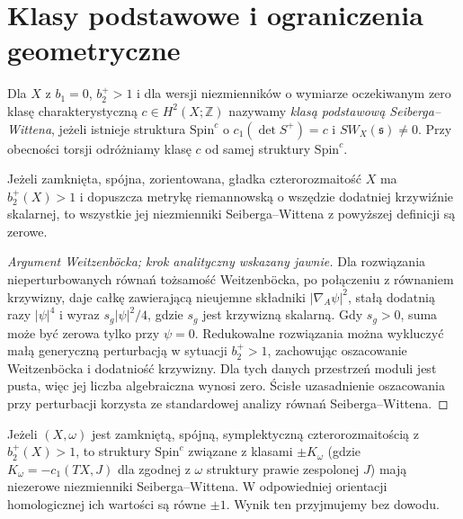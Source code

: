 \section{Klasy podstawowe i ograniczenia geometryczne}
\label{sec:tg-sw-basic}

\begin{definicja}
Dla $X$ z $b_1=0$, $b_2^+>1$ i dla wersji
niezmienników o wymiarze oczekiwanym zero klasę
charakterystyczną $c\in H^2(X;\mathbb Z)$
nazywamy \emph{klasą podstawową Seiberga--Wittena},
jeżeli istnieje struktura $\mathrm{Spin}^c$ o
$c_1(\det S^+)=c$ i $SW_X(\mathfrak s)\ne0$.
Przy obecności torsji odróżniamy klasę $c$ od samej
struktury $\mathrm{Spin}^c$.
\end{definicja}

\begin{twierdzenie}
\label{thm:tg-sw-psc}
Jeżeli zamknięta, spójna, zorientowana,
gładka czterorozmaitość $X$ ma $b_2^+(X)>1$
i dopuszcza metrykę riemannowską o wszędzie dodatniej
krzywiźnie skalarnej, to wszystkie jej niezmienniki
Seiberga--Wittena z powyższej definicji są zerowe.
\end{twierdzenie}

\begin{proof}[Argument Weitzenböcka; krok analityczny wskazany jawnie]
Dla rozwiązania nieperturbowanych równań tożsamość
Weitzenböcka, po połączeniu z równaniem krzywizny,
daje całkę zawierającą nieujemne składniki
$|\nabla_A\psi|^2$, stałą dodatnią razy $|\psi|^4$
i wyraz $s_g|\psi|^2/4$, gdzie $s_g$ jest krzywizną
skalarną. Gdy $s_g>0$, suma może być zerowa tylko
przy $\psi=0$. Redukowalne rozwiązania można wykluczyć
małą generyczną perturbacją w sytuacji $b_2^+>1$,
zachowując oszacowanie Weitzenböcka i dodatniość krzywizny.
Dla tych danych przestrzeń moduli jest pusta, więc
jej liczba algebraiczna wynosi zero.
Ścisłe uzasadnienie oszacowania przy perturbacji
korzysta ze standardowej analizy równań Seiberga--Wittena.
\end{proof}

\begin{twierdzenie}
\label{thm:tg-sw-taubes}
Jeżeli $(X,\omega)$ jest zamkniętą, spójną,
symplektyczną czterorozmaitością z $b_2^+(X)>1$,
to struktury $\mathrm{Spin}^c$ związane z klasami
$\pm K_\omega$ (gdzie $K_\omega=-c_1(TX,J)$ dla
zgodnej z $\omega$ struktury prawie zespolonej $J$)
mają niezerowe niezmienniki Seiberga--Wittena.
W odpowiedniej orientacji homologicznej ich wartości
są równe $\pm1$. Wynik ten przyjmujemy bez dowodu.
\end{twierdzenie}


